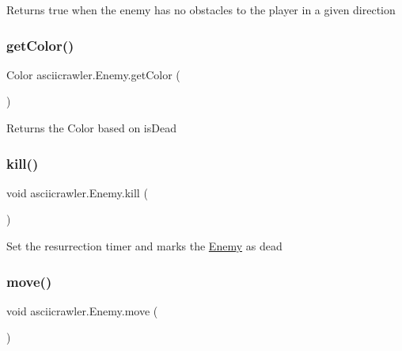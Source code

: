Returns true when the enemy has no obstacles to the player in a given direction \mbox{\label{classasciicrawler_1_1Enemy_a86551f4c55693124ea420002af778fdc}} 
\subsubsection{\texorpdfstring{get\+Color()}{getColor()}}
{\footnotesize\ttfamily Color asciicrawler.\+Enemy.\+get\+Color (\begin{DoxyParamCaption}{ }\end{DoxyParamCaption})\hspace{0.3cm}{\ttfamily [inline]}}

Returns the Color based on is\+Dead \mbox{\label{classasciicrawler_1_1Enemy_afe6ebef5eeb864014ca199659b075d49}} 
\subsubsection{\texorpdfstring{kill()}{kill()}}
{\footnotesize\ttfamily void asciicrawler.\+Enemy.\+kill (\begin{DoxyParamCaption}{ }\end{DoxyParamCaption})\hspace{0.3cm}{\ttfamily [inline]}}

Set the resurrection timer and marks the \hyperlink{classasciicrawler_1_1Enemy}{Enemy} as dead \mbox{\label{classasciicrawler_1_1Enemy_afde325bd1c572dd3ff925b335be6ab0e}} 
\subsubsection{\texorpdfstring{move()}{move()}}
{\footnotesize\ttfamily void asciicrawler.\+Enemy.\+move (\begin{DoxyParamCaption}{ }\end{DoxyParamCaption})\hspace{0.3cm}{\ttfamily [inline]}}

